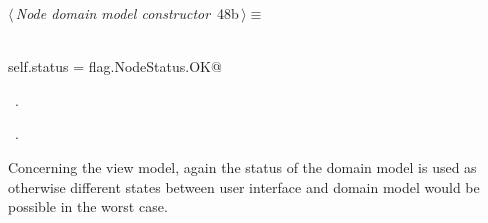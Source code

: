 \documentclass[
    a4paper,      %
    10pt,         %
    openright,    %
    notitlepage,  %
    parskip=half, %
]{scrreprt}       %
\theoremstyle{definition}                    %
\begin{document}
\begin{flushleft} \small
\begin{minipage}{\linewidth}\label{scrap67}\raggedright\small
{} $\langle\,${\itshape Node domain model constructor}\nobreak\ {\footnotesize {48b}}$\,\rangle\equiv$
\vspace{-1exm}
\begin{list}{}{} \item
\mbox{}\lstinline@@\\
\mbox{}\lstinline@    self.status = flag.NodeStatus.OK@\\
\mbox{}\lstinline@@{\NWsep}
\end{list}
\vspace{-1.5ex}
\footnotesize
\begin{list}{}{\setlength{\itemsep}{-\parsep}\setlength{\itemindent}{-\leftmargin}}
\item \NWtxtMacroDefBy\ .
\item \NWtxtMacroRefIn\ .

\item{}
\end{list}
\end{minipage}\vspace{4ex}
\end{flushleft}
Concerning the view model, again the status of the domain model is used as
otherwise different states between user interface and domain model would be
possible in the worst case.
\end{document}
